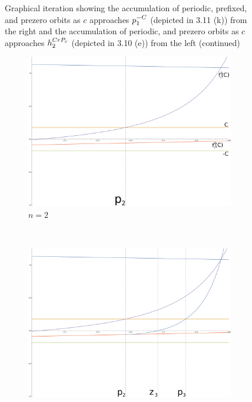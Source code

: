 \begin{figure}[ht]
		\caption{Graphical iteration showing the accumulation of periodic, prefixed, and prezero orbits as $c$ approaches $p^{-C}_1$ (depicted in 3.11 (k)) from the right and the accumulation of periodic, and prezero orbits as $c$ approaches $h^{CrP_c}_2$ (depicted in 3.10 (e))  from the left (continued)}\label{fig:giters2}
\end{figure}

\begin{figure}[ht]
		\centering
		\begin{subfigure}[b]{0.5\textwidth}
				\includegraphics[width=\textwidth]{./img/cplot1H}
				\caption{$n = 2$}
				\label{fig:cplot1H}
		\end{subfigure}%
		~ %
		\begin{subfigure}[b]{0.5\textwidth}
				\includegraphics[width=\textwidth]{./img/cplot2H}

\end{subfigure}
\end{figure}
